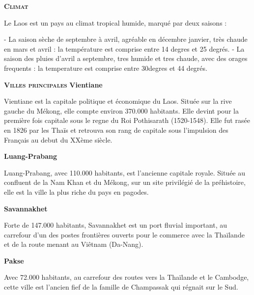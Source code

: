 \begin{multicols}{2}
\textbf{\textsc{Climat}}

Le Laos est un pays au climat tropical humide, marqué par deux saisons :

- La saison sèche de septembre à avril, agréable en décembre janvier, très chaude en mars et avril : la température est comprise entre 14 degres et 25 degrés.
- La saison des pluies d’avril a septembre, tres humide et tres chaude, avec des orages frequents : la temperature est comprise entre 30degres et 44 degrés.

\textbf{\textsc{Villes principales}}
\textbf{Vientiane}

Vientiane est la capitale politique et économique du Laos. Située sur la rive gauche du Mékong, elle compte environ 370.000 habitants. Elle devint pour la première fois capitale sous le regne du Roi Pothisarath (1520-1548). Elle fut rasée en 1826 par les Thaïs et retrouva son rang de capitale sous l’impulsion des Français au debut du XXème siècle.

\textbf{Luang-Prabang}

Luang-Prabang, avec 110.000 habitants, est l’ancienne capitale royale. Située au confluent de la Nam Khan et du Mékong, sur un site privilégié de la préhistoire, elle est la ville la plus riche du pays en pagodes.

\textbf{Savannakhet}

Forte de 147.000 habitants, Savannakhet est un port fluvial important, au carrefour d’un des postes frontières ouverts pour le commerce avec la Thaïlande et de la route menant au Viêtnam (Da-Nang).

\textbf{Pakse}

Avec 72.000 habitants, au carrefour des routes vers la Thaïlande et le Cambodge, cette ville est l’ancien fief de la famille de Champassak qui régnait sur le Sud.

\end{multicols}
